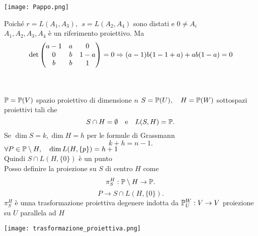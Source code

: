 \documentclass[12px]{article}
\begin{document}
\begin{center}
	\texttt{[image: Pappo.png]}
\end{center}
\begin{dimo}
	Poiché $r = L(A_1,A_3),\ \ s=L(A_2,A_4)$ sono distati e $0\neq A_i$\\
	$A_1,A_2,A_3,A_4$ è un riferimento proiettivo. Ma
	\[
		\det\begin{pmatrix}a-1 & a & 0 \\ 0 &b &1 - a\\ b & b & 1\end{pmatrix} = 0 \Rightarrow  (a-1)b(1-1+a)+ab(1-a)=0
	\] 

\end{dimo}

\ \\ \hline \ \\
 $\mathbb{P}=\mathbb{P}(V)$ spazio proiettivo di dimensione $n$ $S = \mathbb{P} (U),\ \ \ H = \mathbb{P}(W)$ sottospazi proiettivi tali che 
 \[
  S\cap H = \emptyset \ \ \text{ e} \ \ \ L(S,H)=\mathbb{P}
 .\] 
 Se $\dim S = k, \dim H = h$ per le formule di Grassmann
  \[
 k + h = n-1
 .\] 
$\forall P\in \mathbb{P}\setminus H, \ \ \ \dim L(H,\{p\})=h+1$\\
Quindi $S\cap L(H,\{0\}) $ è un punto\\
Posso definire la proiezione su  $S$ di centro $H$ come
\[
 \pi^H_S: \mathbb{P}\setminus H \rightarrow \mathbb{P}
.\] 
\[
	P \rightarrow S\cap L(H,\{0\})
.\] 
$\pi^H_S$ è unna trasformazione proiettiva degenere indotta da $\mathbb{P}^W_U :V \rightarrow V$ proiezione su $U$ parallela ad $H$\\
\begin{center}
	\texttt{[image: trasformazione\_proiettiva.png]}
\end{center}
\end{document}
